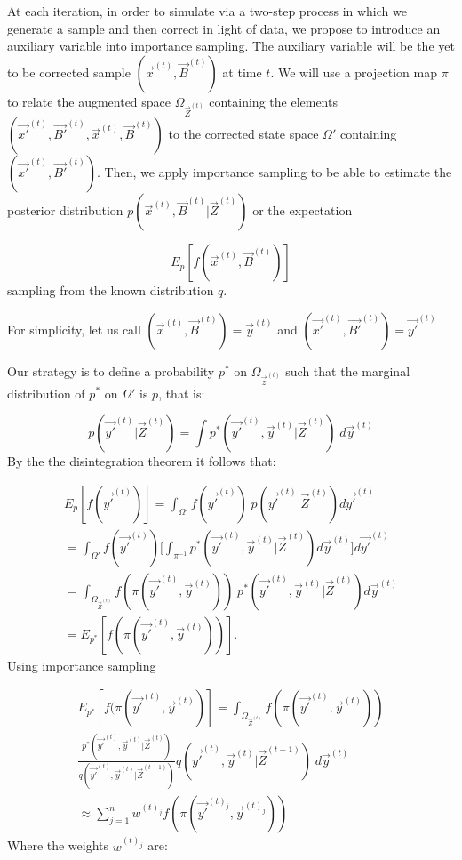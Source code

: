 At each iteration, in order to simulate via a two-step process in which we generate a sample and then correct in light of data, we propose to introduce an auxiliary variable into importance sampling. The auxiliary variable will be the yet to be corrected sample $(\vec{x}^{(t)}, \vec{B}^{(t)})$ at time $t$. We will use a projection map $\pi$ to relate the augmented space $\Omega_{\vec{Z}^{(t)}}$ containing the elements $(\vec{x'}^{(t)}, \vec{B'}^{(t)}, \vec{x}^{(t)}, \vec{B}^{(t)})$ to the corrected state space $\Omega'$ containing $(\vec{x'}^{(t)}, \vec{B'}^{(t)})$. Then, we apply importance sampling to be able to estimate the posterior distribution $p(\vec{x}^{(t)}, \vec{B}^{(t)} | \vec{Z}^{(t)})$ or the expectation

\[
E_{p}[f(\vec{x}^{(t)},\vec{B}^{(t)})]
\]
sampling from the known distribution $q$.

For simplicity, let us call $(\vec{x}^{(t)}, \vec{B}^{(t)}) = \vec{y}^{(t)}$ and $(\vec{x'}^{(t)}, \vec{B'}^{(t)}) = \vec{y'}^{(t)}$

Our strategy is to define a probability $p^*$ on $\Omega_{\vec{z}^{(t)}}$ such that the marginal distribution of $p^*$ on $\Omega'$ is $p$, that is:

\[
p(\vec{y'}^{(t)} | \vec{Z}^{(t)}) = \int p^*(\vec{y'}^{(t)}, \vec{y}^{(t)} | \vec{Z}^{(t)})\; d\vec{y}^{(t)}
\]
By the the disintegration theorem it follows that:

\begin{multline*}
E_{p}[f(\vec{y'}^{(t)})]  = \int_{\Omega'} f(\vec{y'}^{(t)})\; p(\vec{y'}^{(t)} | \vec{Z}^{(t)}) d \vec{y'}^{(t)} \\
= \int_{\Omega'} f(\vec{y'}^{(t)})\Bigg[\int_{\pi^{-1}} p^*(\vec{y'}^{(t)}, \vec{y}^{(t)} | \vec{Z}^{(t)}) d\vec{y}^{(t)}\Bigg] d\vec{y'}^{(t)} \\ 
= \int_{\Omega_{\vec{Z}^{(t)}}} f(\pi(\vec{y'}^{(t)}, \vec{y}^{(t)}))\; p^*(\vec{y'}^{(t)}, \vec{y}^{(t)} | \vec{Z}^{(t)}) d \vec{y}^{(t)} \\ 
= E_{p^*}[f(\pi (\vec{y'}^{(t)}, \vec{y}^{(t)}))].
\end{multline*}
Using importance sampling

\begin{multline*}
E_{p^*}[f(\pi (\vec{y'}^{(t)}, \vec{y}^{(t)})] = \int_{\Omega_{\vec{Z}^{(t)}}} f(\pi(\vec{y'}^{(t)},  \vec{y}^{(t)})) \\ \frac{p^*(\vec{y'}^{(t)}, \vec{y}^{(t)}|\vec{Z}^{(t)})} {q(\vec{y'}^{(t)}, \vec{y}^{(t)} | \vec{Z}^{(t-1)})} q(\vec{y'}^{(t)}, \vec{y}^{(t)} | \vec{Z}^{(t-1)}) \; d\vec{y}^{(t)} \\ 
\approx \sum_{j=1}^n  w^{(t)_j}f(\pi (\vec{y'}^{(t)_j}, \vec{y}^{(t)_j}))
\end{multline*}
Where the weights $w^{(t)_j}$ are:

